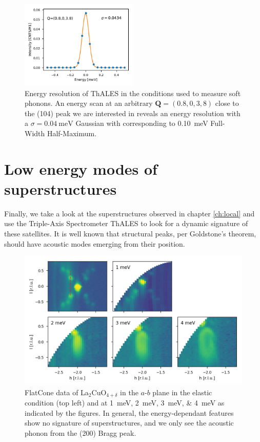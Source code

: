 \begin{figure}
    \centering
    \includegraphics[width=0.5\textwidth]{fig/lowen/resolution_phonons.pdf}
    \caption{Energy resolution of ThALES in the conditions used to measure soft phonons. An energy scan at an arbitrary $\bm{Q} = (0.8,0,3,8)$ close to the (104) peak we are interested in reveals an energy resolution with a $\sigma = \SI{0.04}{\milli\eV}$ Gaussian with corresponding to \SI{0.10}{\milli\eV} Full-Width Half-Maximum.}
    \label{fig:phonon_resolution}
\end{figure}

\section{Low energy modes of superstructures}
Finally, we take a look at the superstructures observed in chapter \ref{ch:local} and use the Triple-Axis Spectrometer ThALES to look for a dynamic signature of these satellites. It is well known that structural peaks, per Goldstone's theorem, should have acoustic modes emerging from their position. 

\begin{figure}
    \centering
    \includegraphics[width=\textwidth]{fig/lowen/phason_flatcone.png}
    \caption{FlatCone data of La$_2$CuO$_{4+\delta}$ in the $a$-$b$ plane in the elastic condition (top left) and at \SIlist{1;2;3;4}{\milli\eV} as indicated by the figures. In general, the energy-dependant features show no signature of superstructures, and we only see the acoustic phonon from the (200) Bragg peak.}
    \label{fig:phason_flatcone_maps}
\end{figure}

